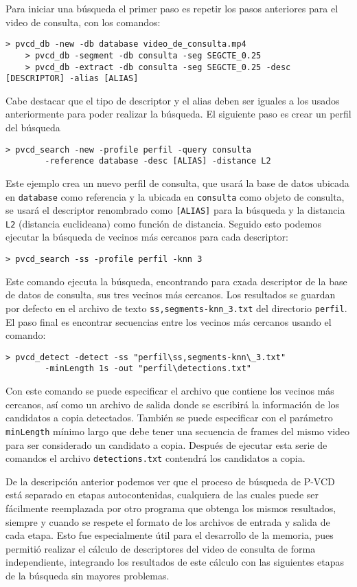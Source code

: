 Para iniciar una búsqueda el primer paso es repetir los pasos anteriores para el video de consulta, con los comandos:
\begin{lstlisting}[style=BashInputStyle]
    > pvcd_db -new -db database video_de_consulta.mp4
    > pvcd_db -segment -db consulta -seg SEGCTE_0.25
    > pvcd_db -extract -db consulta -seg SEGCTE_0.25 -desc [DESCRIPTOR] -alias [ALIAS]
\end{lstlisting}
Cabe destacar que el tipo de descriptor y el alias deben ser iguales a los usados anteriormente para poder realizar la búsqueda. El siguiente paso es crear un perfil del búsqueda
\begin{lstlisting}[style=BashInputStyle]
    > pvcd_search -new -profile perfil -query consulta
        -reference database -desc [ALIAS] -distance L2
\end{lstlisting}
Este ejemplo crea un nuevo perfil de consulta, que usará la base de datos ubicada en \texttt{database} como referencia y la ubicada en \texttt{consulta} como objeto de consulta, se usará el descriptor renombrado como \texttt{[ALIAS]} para la búsqueda y la distancia \texttt{L2} (distancia euclideana) como función de distancia. Seguido esto podemos ejecutar la búsqueda de vecinos más cercanos para cada descriptor:
\begin{lstlisting}[style=BashInputStyle]
    > pvcd_search -ss -profile perfil -knn 3
\end{lstlisting}
Este comando ejecuta la búsqueda, encontrando para cxada descriptor de la base de datos de consulta, sus tres vecinos más cercanos. Los resultados se guardan por defecto en el archivo de texto \texttt{ss,segments-knn\_3.txt} del directorio \texttt{perfil}. El paso final es encontrar secuencias entre los vecinos más cercanos usando el comando:
\begin{lstlisting}[style=BashInputStyle]
    > pvcd_detect -detect -ss "perfil\ss,segments-knn\_3.txt"
        -minLength 1s -out "perfil\detections.txt"
\end{lstlisting}
Con este comando se puede especificar el archivo que contiene los vecinos más cercanos, así como un archivo de salida donde se escribirá la información de los candidatos a copia detectados. También se puede especificar con el parámetro \texttt{minLength} mínimo largo que debe tener una secuencia de frames del mismo video para ser considerado un candidato a copia. Después de ejecutar esta serie de comandos el archivo \texttt{detections.txt} contendrá los candidatos a copia.

De la descripción anterior podemos ver que el proceso de búsqueda de P-VCD está separado en etapas autocontenidas, cualquiera de las cuales puede ser fácilmente reemplazada por otro programa que obtenga los mismos resultados, siempre y cuando se respete el formato de los archivos de entrada y salida de cada etapa. Esto fue especialmente útil para el desarrollo de la memoria, pues permitió realizar el cálculo de descriptores del video de consulta de forma independiente, integrando los resultados de este cálculo con las siguientes etapas de la búsqueda sin mayores problemas. 
